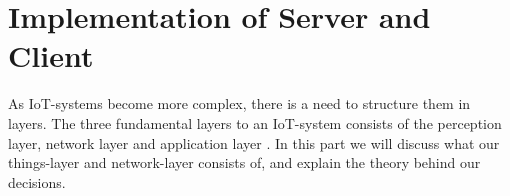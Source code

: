 \section{Implementation of Server and Client}
As IoT-systems become more complex, there is a need to structure them in layers. The three fundamental layers to an IoT-system consists of the perception layer, network layer and application layer \parencite[pp. 347-352]{iot_gateway}. In this part we will discuss what our things-layer and network-layer consists of, and explain the theory behind our decisions. 


